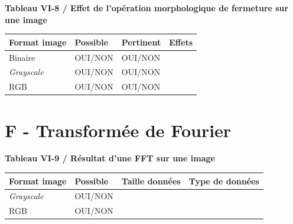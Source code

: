 \textbf{Tableau VI-8 / Effet de l'opération morphologique de fermeture sur une image}
\vspace{-0.3cm}

\begin{center}
\begin{tabular}{|>{\arraybackslash}p{3cm}|>{\centering\arraybackslash}p{2cm}|>{\centering\arraybackslash}p{2cm}|>{\centering\arraybackslash}p{9cm}|}
  \hline
  Format image & Possible & Pertinent & Effets \\
  \hline
  Binaire & OUI/NON & OUI/NON & \rule{0pt}{3em} \\
  \hline
  \textit{Grayscale} & OUI/NON & OUI/NON & \rule{0pt}{2em} \\
  \hline
  RGB & OUI/NON & OUI/NON & \rule{0pt}{2em} \\
  \hline
\end{tabular}
\end{center}
\vspace{-0.3cm}

\noindent
{} 
\vspace{-0.3cm}

\section{F - Transformée de Fourier}
\vspace{-0.3cm}

\textbf{Tableau VI-9 / Résultat d'une FFT sur une image}
\vspace{-0.3cm}

\begin{center}
\begin{tabular}{|>{\arraybackslash}p{3cm}|>{\centering\arraybackslash}p{2cm}|>{\centering\arraybackslash}p{5cm}|>{\centering\arraybackslash}p{4cm}|}
  \hline
  Format image & Possible & Taille données & Type de données \\
  \hline
  \textit{Grayscale} & OUI/NON & & \rule{0pt}{1.2em} \\
  \hline
  RGB & OUI/NON & & \rule{0pt}{1.2em} \\
  \hline
\end{tabular}
\end{center}
\vspace{-0.3cm}


